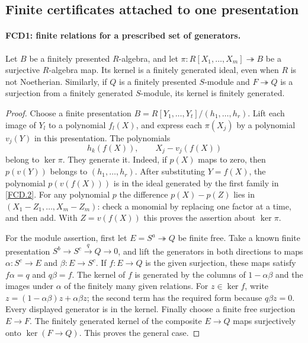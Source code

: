 \documentclass[11pt,a4paper]{article}
\numberwithin{equation}{section}
\theoremstyle{remark}\newtheorem{remark}[theorem]{Remark}
\begin{document}
\subsection{Finite certificates attached to one presentation}

\paragraph{FCD1: finite relations for a prescribed set of generators.}
\label{claim:FCD1}
Let $B$ be a finitely presented $R$-algebra, and let
$\pi:R[X_1,\ldots,X_m]\twoheadrightarrow B$ be a surjective
$R$-algebra map.  Its kernel is a finitely generated ideal, even when
$R$ is not Noetherian.  Similarly, if $Q$ is a finitely presented
$S$-module and $F\twoheadrightarrow Q$ is a surjection from a
finitely generated $S$-module, its kernel is finitely generated.

\begin{proof}
Choose a finite presentation
$B=R[Y_1,\ldots,Y_t]/(h_1,\ldots,h_r)$.
Lift each image of $Y_l$ to a polynomial $f_l(X)$, and express each
$\pi(X_j)$ by a polynomial $v_j(Y)$ in this presentation.  The
polynomials
\[
 h_k(f(X)),\qquad X_j-v_j(f(X))                         \tag{FCD.2}\label{FCD.2}
\]
belong to $\ker\pi$.  They generate it.  Indeed, if $p(X)$ maps to
zero, then $p(v(Y))$ belongs to $(h_1,\ldots,h_r)$.
After substituting $Y=f(X)$, the polynomial $p(v(f(X)))$ is in
the ideal generated by the first family in \eqref{FCD.2}.
For any polynomial $p$ the difference $p(X)-p(Z)$ lies in
$(X_1-Z_1,\ldots,X_m-Z_m)$: check a monomial by replacing one
factor at a time, and then add.  With $Z=v(f(X))$ this proves the
assertion about $\ker\pi$.

For the module assertion, first let $E=S^a\twoheadrightarrow Q$
be finite free.  Take a known finite presentation
$S^b\to S^c\xrightarrow{q}Q\to0$, and lift the generators in
both directions to maps $\alpha:S^c\to E$ and
$\beta:E\to S^c$.  If $f:E\to Q$ is the given surjection,
these maps satisfy $f\alpha=q$ and $q\beta=f$.
The kernel of $f$ is generated by the columns of $1-\alpha\beta$
and the images under $\alpha$ of the finitely many given relations.
For $z\in\ker f$, write
$z=(1-\alpha\beta)z+\alpha\beta z$; the second term has the
required form because $q\beta z=0$.  Every displayed generator is
in the kernel.  Finally choose a finite free surjection $E\to F$.
The finitely generated kernel of the composite $E\to Q$ maps
surjectively onto $\ker(F\to Q)$.  This proves the general case.
\end{proof}
\end{document}
